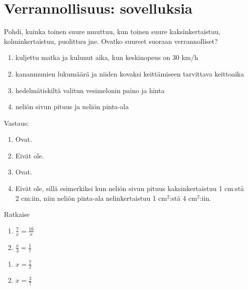 
\chapter{Verrannollisuus: sovelluksia}

\begin{tehtava}
    Pohdi, kuinka toinen suure muuttuu, kun toinen suure kaksinkertaistuu,
    kolminkertaistuu, puolittuu jne. Ovatko suureet suoraan verrannolliset?
    
    \begin{enumerate}
        \item kuljettu matka ja kulunut aika, kun keskinopeus on 30 km/h
        \item kananmunien lukumäärä ja niiden kovaksi keittämiseen tarvittava keittoaika
        \item hedelmätiskiltä valitun vesimelonin paino ja hinta
        \item neliön sivun pituus ja neliön pinta-ala
    \end{enumerate}
    
    \begin{vastaus}
        Vastaus:
        \begin{enumerate}
            \item Ovat.
            \item Eivät ole.
            \item Ovat.
            \item Eivät ole, sillä esimerkiksi kun neliön sivun pituus
                kaksinkertaistuu 1 cm:stä 2 cm:iin, niin neliön pinta-ala
                nelinkertaistuu 1 cm$^2$:stä 4 cm$^2$:iin.
        \end{enumerate}
    \end{vastaus}
\end{tehtava}

\begin{tehtava}
Ratkaise
\begin{enumerate}
\item $ \frac{7}{x} = \frac{16}{x}$
\item $ \frac{x}{3} = \frac{1}{7}$
\end{enumerate}
\begin{vastaus}
\begin{enumerate}
\item $x= \frac{7}{2}$
\item $x= \frac{3}{7}$
\end{enumerate}
\end{vastaus}
\end{tehtava}

